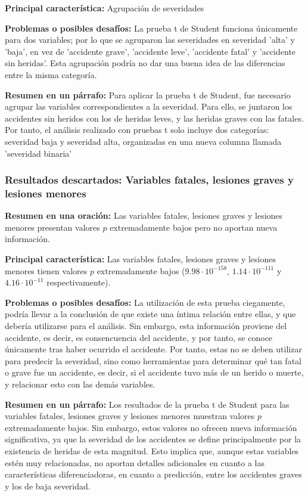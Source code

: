 \documentclass{book}
\begin{document}
\textbf{Principal característica:} Agrupación de severidades

\textbf{Problemas o posibles desafíos:} La prueba t de Student funciona únicamente para dos variables; por lo que se agruparon las severidades en severidad 'alta' y 'baja', en vez de 'accidente grave', 'accidente leve', 'accidente fatal' y 'accidente sin heridas'. Esta agrupación podría no dar una buena idea de las diferencias entre la misma categoría.

\textbf{Resumen en un párrafo:} Para aplicar la prueba t de Student, fue necesario agrupar las variables correspondientes a la severidad. Para ello, se juntaron los accidentes sin heridos con los de heridas leves, y las heridas graves con las fatales. Por tanto, el análisis realizado con pruebas t solo incluye dos categorías: severidad baja y severidad alta, organizadas en una nueva columna llamada 'severidad binaria'


\subsubsection{Resultados descartados: Variables fatales, lesiones graves y lesiones menores}

\textbf{Resumen en una oración:} Las variables fatales, lesiones graves y lesiones menores presentan valores $p$ extremadamente bajos pero no aportan nueva información.

\textbf{Principal característica:} 
Las variables fatales, lesiones graves y lesiones menores tienen valores $p$ extremadamente bajos ($9.98 \cdot 10^{-158}$, $1.14 \cdot 10^{-111}$ y $4.16 \cdot 10^{-11}$ respectivamente).

\textbf{Problemas o posibles desafíos:} La utilización de esta prueba ciegamente, podría llevar a la conclusión de que existe una íntima relación entre ellas, y que debería utilizarse para el análisis. Sin embargo, esta información proviene del accidente, es decir, es consencuencia del accidente, y por tanto, se conoce únicamente tras haber ocurrido el accidente. Por tanto, estas no se deben utilizar para predecir la severidad, sino como herramientas para determinar qué tan fatal o grave fue un accidente, es decir, si el accidente tuvo más de un herido o muerte, y relacionar esto con las demás variables.

\textbf{Resumen en un párrafo:} Los resultados de la prueba t de Student para las variables fatales, lesiones graves y lesiones menores muestran valores $p$ extremadamente bajos. Sin embargo, estos valores no ofrecen nueva información significativa, ya que la severidad de los accidentes se define principalmente por la existencia de heridas de esta magnitud. Esto implica que, aunque estas variables estén muy relacionadas, no aportan detalles adicionales en cuanto a las características diferenciadoras, en cuanto a predicción, entre los accidentes graves y los de baja severidad.
\end{document}
